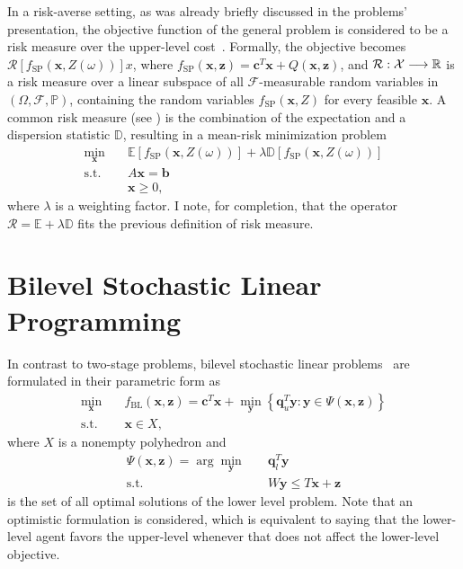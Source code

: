 \documentclass[twoside,11pt]{article}
\begin{document}
In a risk-averse setting, as was already briefly discussed in the problems' presentation, the objective function of the general problem is considered to be a risk measure over the upper-level cost~\citep{noyanRiskaverseTwostageStochastic2012,millerRiskAverseTwoStageStochastic2011,ahmedConvexityDecompositionMeanrisk2006}.
Formally, the objective becomes $\mathcal{R}\left[ f_\text{SP}(\bm{x},Z(\omega)) \right]x $, where $f_{\text{SP}}(\bm{x},\bm{z}) = \bm{c}^{T}\bm{x} + Q(\bm{x},\bm{z})$, and $\mathcal{R}: \mathcal{X} \longrightarrow \mathbb{R}$ is a risk measure over a linear subspace of all $\mathcal{F}$-measurable random variables in $\left( \Omega, \mathcal{F},\mathbb{P} \right)$, containing the random variables $f_\text{SP}(\bm{x},Z)$ for every feasible $\bm{x}$.
A common risk measure (see \citet{noyanRiskaverseTwostageStochastic2012}) is the combination of the expectation and a dispersion statistic $\mathbb{D}$, resulting in a mean-risk minimization problem
\begin{align*}
    \min_{\bm{x}} \quad & \mathbb{E}\left[ f_\text{SP}(\bm{x},Z(\omega)) \right] + \lambda \mathbb{D}\left[ f_\text{SP}(\bm{x},Z(\omega)) \right] \\
    \textrm{s.t.} \quad & A\bm{x} = \bm{b} \\
      & \bm{x} \ge 0
,\end{align*}
where $\lambda$ is a weighting factor.
I note, for completion, that the operator $\mathcal{R} = \mathbb{E} + \lambda \mathbb{D}$ fits the previous definition of risk measure.

\section*{Bilevel Stochastic Linear Programming}

In contrast to two-stage problems, bilevel stochastic linear problems~\citep{burtscheidtBilevelLinearOptimization2020} are formulated in their parametric form as
\begin{align*}
\min_{\bm{x}} \quad & f_\text{BL}(\bm{x},\bm{z}) = \bm{c}^{T}\bm{x} + \min_{\bm{y}}\left\{ \bm{q}_u^{T}\bm{y} : \bm{y} \in \Psi(\bm{x},\bm{z}) \right\}  \\
    \textrm{s.t.} \quad & \bm{x} \in X
,\end{align*}
where $X$ is a nonempty polyhedron and
\begin{align*}
    \Psi(\bm{x}, \bm{z}) = \arg\min_{\bm{y}} \quad & \bm{q}_l^{T} \bm{y} \\
    \textrm{s.t.} \quad & W\bm{y} \le T\bm{x} + \bm{z}
\end{align*}
is the set of all optimal solutions of the lower level problem.
Note that an optimistic formulation is considered, which is equivalent to saying that the lower-level agent favors the upper-level whenever that does not affect the lower-level objective. 
\end{document}
